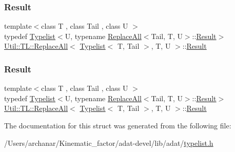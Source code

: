 \subsubsection{\texorpdfstring{Result}{Result}\hspace{0.1cm}{\footnotesize\ttfamily [2/3]}}
{\footnotesize\ttfamily template$<$class T , class Tail , class U $>$ \\
typedef \mbox{\hyperlink{structUtil_1_1Typelist}{Typelist}}$<$U, typename \mbox{\hyperlink{structUtil_1_1TL_1_1ReplaceAll}{Replace\+All}}$<$Tail, T, U$>$\+::\mbox{\hyperlink{structUtil_1_1TL_1_1ReplaceAll_3_01Typelist_3_01T_00_01Tail_01_4_00_01T_00_01U_01_4_ac7e5d69efc7e252ec9e6db5a6885ac44}{Result}}$>$ \mbox{\hyperlink{structUtil_1_1TL_1_1ReplaceAll}{Util\+::\+T\+L\+::\+Replace\+All}}$<$ \mbox{\hyperlink{structUtil_1_1Typelist}{Typelist}}$<$ T, Tail $>$, T, U $>$\+::\mbox{\hyperlink{structUtil_1_1TL_1_1ReplaceAll_3_01Typelist_3_01T_00_01Tail_01_4_00_01T_00_01U_01_4_ac7e5d69efc7e252ec9e6db5a6885ac44}{Result}}}

\mbox{\label{structUtil_1_1TL_1_1ReplaceAll_3_01Typelist_3_01T_00_01Tail_01_4_00_01T_00_01U_01_4_ac7e5d69efc7e252ec9e6db5a6885ac44}} 
\subsubsection{\texorpdfstring{Result}{Result}\hspace{0.1cm}{\footnotesize\ttfamily [3/3]}}
{\footnotesize\ttfamily template$<$class T , class Tail , class U $>$ \\
typedef \mbox{\hyperlink{structUtil_1_1Typelist}{Typelist}}$<$U, typename \mbox{\hyperlink{structUtil_1_1TL_1_1ReplaceAll}{Replace\+All}}$<$Tail, T, U$>$\+::\mbox{\hyperlink{structUtil_1_1TL_1_1ReplaceAll_3_01Typelist_3_01T_00_01Tail_01_4_00_01T_00_01U_01_4_ac7e5d69efc7e252ec9e6db5a6885ac44}{Result}}$>$ \mbox{\hyperlink{structUtil_1_1TL_1_1ReplaceAll}{Util\+::\+T\+L\+::\+Replace\+All}}$<$ \mbox{\hyperlink{structUtil_1_1Typelist}{Typelist}}$<$ T, Tail $>$, T, U $>$\+::\mbox{\hyperlink{structUtil_1_1TL_1_1ReplaceAll_3_01Typelist_3_01T_00_01Tail_01_4_00_01T_00_01U_01_4_ac7e5d69efc7e252ec9e6db5a6885ac44}{Result}}}



The documentation for this struct was generated from the following file\+:\begin{DoxyCompactItemize}
\item 
/\+Users/archanar/\+Kinematic\+\_\+factor/adat-\/devel/lib/adat/\mbox{\hyperlink{adat-devel_2lib_2adat_2typelist_8h}{typelist.\+h}}\end{DoxyCompactItemize}
